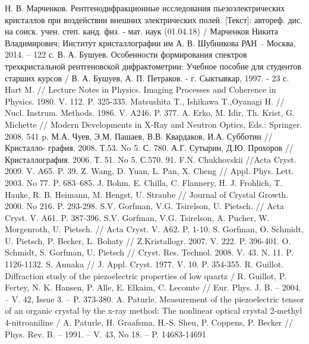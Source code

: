 \begin{thebibliography}{99}
    Н. В. Марченков. Рентгенодифракционные исследования пьезоэлектрических кристаллов
    при воздействии внешних электрических полей. [Текст]: автореф. дис. на соиск.
     учен. степ. канд. физ. - мат. наук (01.04.18) /
     Марченков Никита Владимирович; Институт кристаллографии им А. В. Шубникова РАН  – Москва, 2014. – 122 с.
     В. А. Бушуев. Особенности формирования спектров трехкристальной рентгеновской дифрактометрии:
    Учебное пособие для студентов старших курсов  / В. А. Бушуев, А. П. Петраков. - г. Сыктывкар, 1997. - 23 с.
      Hart M. // Lecture Notes in Physics. Imaging Processes and Coherence in Physics. 1980. V. 112. P. 325-335.
    Matsushita T., Ishikawa T.,Oyanagi H. // Nucl. Instrum. Methods. 1986. V. A246. P. 377.
      A. Erko, M. Idir, Th. Krist, G. Michette // Modern Developments in X-Ray and Neutron Optics, Eds.: Springer. 2008. 541 p.
    М.А. Чуев, Э.М. Пашаев, В.В. Квардаков, И.А. Субботин // Кристалло- графия. 2008. Т.53. No 5. С. 780.
А.Г. Сутырин, Д.Ю. Прохоров //Кристаллография. 2006. Т. 51. No 5. С.570. 91. F.N. Chukhovskii //Acta Cryst. 2009. V. A65. P. 39.
  Z. Wang, D. Yuan, L. Pan, X. Cheng // Appl. Phys. Lett. 2003. No 77. P. 683–685.
    J. Bohm, E. Chilla, C. Flannery, H. J. Frohlich, T. Hauke, R. B. Heimann, M. Hengst, U. Straube // Journal of Crystal Growth. 2000. No 216. P. 293-298.
  S.V. Gorfman, V.G. Tsirelson, U. Pietsch. // Acta Cryst. V. A61. P. 387-396.
  S.V. Gorfman, V.G. Tsirelson, A. Pucher, W. Morgenroth, U. Pietsch. // Acta Cryst. V. A62. P. 1-10.
  S. Gorfman, O. Schmidt, U. Pietsch, P. Becker, L. Bohaty // Z.Kristallogr. 2007. V. 222. P. 396-401.
  O. Schmidt, S. Gorfman, U. Pietsch // Cryst. Res. Technol. 2008. V. 43. N. 11. P. 1126-1132.
  S. Annaka // J. Appl. Cryst. 1977. V. 10. P. 354-355.
  R. Guillot. Diffraction study of the piezoelectric properties of low quartz
  / R. Guillot, P. Fertey, N. K. Hansen, P. Alle, E. Elkaim, C. Lecomte //
  Eur. Phys. J. B. – 2004. – V. 42, Issue 3. – P. 373-380.
  A. Paturle. Measurement of the piezoelectric tensor of an organic crystal by the x-ray method:
   The nonlinear optical crystal 2-methyl 4-nitroaniline / A. Paturle, H. Graafsma,
    H.-S. Sheu, P. Coppens, P. Becker // Phys. Rev. B. – 1991. – V. 43, No 18. – P. 14683-14691


\end{thebibliography}
